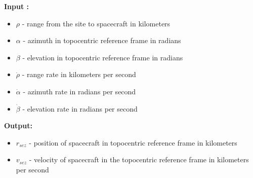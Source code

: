 \documentclass[11pt, reqno]{article}    %
\begin{document}
\noindent \textbf{Input : }
\begin{itemize}
    \item \( \rho \) - range from the site to spacecraft in kilometers
    \item \( \alpha \) - azimuth in topocentric reference frame in radians
    \item \( \beta \) - elevation in topocentric reference frame in radians 
    \item \( \dot{\rho} \) - range rate in kilometers per second
    \item \( \dot{\alpha} \) - azimuth rate in radians per second
    \item \( \dot{\beta} \) - elevation rate in radians per second
\end{itemize}

\noindent \textbf{Output: }

\begin{itemize}
    \item \( r_{sez} \) - position of spacecraft in topocentric reference frame in kilometers
    \item \( v_{sez} \) - velocity of spacecraft in the topocentric reference frame in kilometers per second
\end{itemize}
\end{document}
